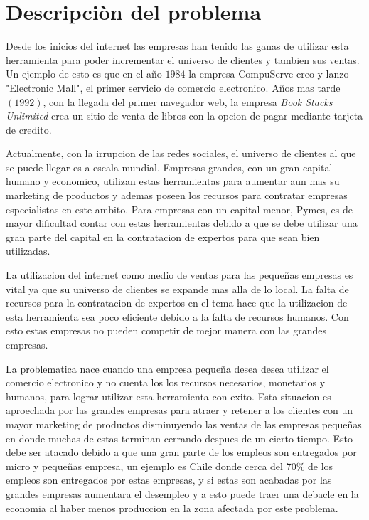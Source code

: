 \section{Descripciòn del problema}




Desde los inicios del internet las empresas han tenido las ganas de utilizar esta herramienta para poder 
incrementar el universo de clientes y tambien sus ventas. Un ejemplo de esto es que en el año $1984$ 
la empresa CompuServe creo y lanzo "Electronic Mall", el primer servicio de comercio electronico\cite{Def:1}. 
Años mas tarde$(1992)$, con la llegada del primer navegador web, la empresa \emph{Book Stacks Unlimited}
 crea un sitio de venta de libros con la opcion de pagar mediante tarjeta de credito.

Actualmente, con la irrupcion de las redes sociales, el universo de clientes al que se puede llegar es a escala 
mundial. Empresas grandes, con un gran capital humano y economico, utilizan estas herramientas para aumentar
aun mas su marketing de productos y ademas poseen los recursos para contratar empresas especialistas en este
ambito. Para empresas con un capital menor, Pymes, es de mayor dificultad contar con estas herramientas debido
a que se debe utilizar una gran parte del capital en la contratacion de expertos para que sean bien utilizadas.

La utilizacion del internet como medio de ventas para las pequeñas empresas es vital ya que su universo de clientes
se expande mas alla de lo local. La falta de recursos para la contratacion de expertos en el tema hace que la 
utilizacion de esta herramienta sea poco eficiente debido a la falta de recursos humanos. Con esto estas empresas
no pueden competir de mejor manera con las grandes empresas.

La problematica nace cuando una empresa pequeña desea desea utilizar el comercio electronico y no cuenta 
los los recursos necesarios, monetarios y humanos, para lograr utilizar esta herramienta con exito. Esta situacion
es aproechada por las grandes empresas para atraer y retener a los clientes con un mayor marketing de productos 
disminuyendo las ventas de las empresas pequeñas en donde muchas de estas terminan cerrando despues de un cierto tiempo.
Esto debe ser atacado debido a que una gran parte de los empleos son entregados por micro y pequeñas empresa,
un ejemplo es Chile donde cerca del 70$\%$ de los empleos son entregados por estas empresas, y si estas son
acabadas por las grandes empresas aumentara el desempleo y a esto puede traer una debacle en la economia al haber menos
 produccion en la zona afectada por este problema.

